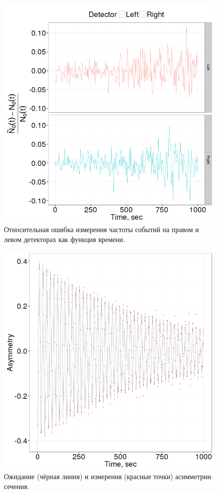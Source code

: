 \documentclass{report}
\begin{document}
\begin{figure}[H]
	\centering
	\includegraphics[width=\textwidth]{edm_img/LR_detector_relErr}
	\caption{Относительная ошибка измерения частоты событий на правом и левом
          детекторах как функция времени.\label{fig:LRDetErr}}
\end{figure}

\begin{figure}[H]
	\centering
	\includegraphics[width=\textwidth]{edm_img/Asymmetry}
	\caption{Ожидание (чёрная линия) и измерения (красные точки)
          асимметрии сечения.\label{fig:Asym}}
\end{figure}
\end{document}
